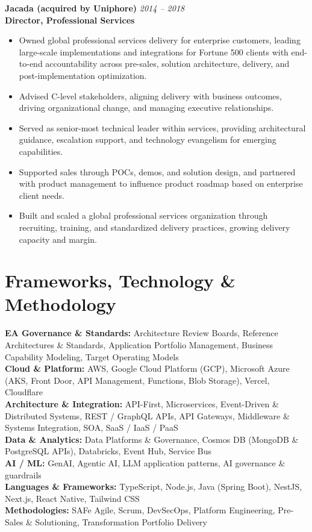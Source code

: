 \documentclass[11pt]{article}
\begin{document}
\vspace{6pt}

\pagebreak

\textbf{Jacada (acquired by Uniphore)} \hfill \textit{2014 -- 2018} \\
\textbf{Director, Professional Services}

\begin{itemize}
  \item Owned global professional services delivery for enterprise customers, leading large-scale implementations and integrations for Fortune 500 clients with end-to-end accountability across pre-sales, solution architecture, delivery, and post-implementation optimization.
  \item Advised C-level stakeholders, aligning delivery with business outcomes, driving organizational change, and managing executive relationships.
  \item Served as senior-most technical leader within services, providing architectural guidance, escalation support, and technology evangelism for emerging capabilities.
  \item Supported sales through POCs, demos, and solution design, and partnered with product management to influence product roadmap based on enterprise client needs.
  \item Built and scaled a global professional services organization through recruiting, training, and standardized delivery practices, growing delivery capacity and margin.
\end{itemize}

\section*{Frameworks, Technology \& Methodology}
\textbf{EA Governance \& Standards:} Architecture Review Boards, Reference Architectures \& Standards, Application Portfolio Management, Business Capability Modeling, Target Operating Models \\
\textbf{Cloud \& Platform:} AWS, Google Cloud Platform (GCP), Microsoft Azure (AKS, Front Door, API Management, Functions, Blob Storage), Vercel, Cloudflare \\
\textbf{Architecture \& Integration:} API-First, Microservices, Event-Driven \& Distributed Systems, REST / GraphQL APIs, API Gateways, Middleware \& Systems Integration, SOA, SaaS / IaaS / PaaS \\
\textbf{Data \& Analytics:} Data Platforms \& Governance, Cosmos DB (MongoDB \& PostgreSQL APIs), Databricks, Event Hub, Service Bus \\
\textbf{AI / ML:} GenAI, Agentic AI, LLM application patterns, AI governance \& guardrails \\
\textbf{Languages \& Frameworks:} TypeScript, Node.js, Java (Spring Boot), NestJS, Next.js, React Native, Tailwind CSS \\
\textbf{Methodologies:} SAFe Agile, Scrum, DevSecOps, Platform Engineering, Pre-Sales \& Solutioning, Transformation Portfolio Delivery
\end{document}
